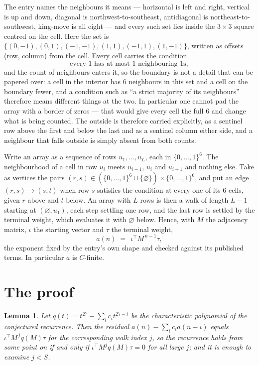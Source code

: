 \documentclass[11pt,a4paper]{article}
\theoremstyle{plain}
\newtheorem{lemma}[theorem]{Lemma}
\theoremstyle{definition}
\begin{document}
The entry names the neighbours it means --- horizontal is left and right, vertical is up and
down, diagonal is northwest-to-southeast, antidiagonal is northeast-to-southwest, king-move is
all eight --- and every such set lies inside the $3\times3$ square centred on the cell. Here
the set is $\{(0,-1), (0,1), (-1,-1), (1,1), (-1,1), (1,-1)\}$, written as offsets (row, column) from the cell. Every cell carries
the condition
\[
\text{every 1 has at most 1 neighbouring 1s},
\]
and the count of neighbours enters it, so the boundary is not a detail that can be papered
over: a cell in the interior has $6$ neighbours in this set and a cell on the boundary
fewer, and a condition such as ``a strict majority of its neighbours'' therefore means
different things at the two. In particular one cannot pad the array with a border of zeros ---
that would give every cell the full $6$ and change what is being counted. The outside is
therefore carried
explicitly, as a sentinel row above the first and below the last and as a sentinel column
either side, and a neighbour that falls outside is simply absent from both counts.

Write an array as a sequence of rows $u_1,\dots,u_L$, each in
$\{0,\dots,1\}^{6}$. The neighbourhood of a cell in row $u_i$ meets $u_{i-1}$,
$u_i$ and $u_{i+1}$ and nothing else. Take as vertices the pairs
$(r,s)\in(\{0,\dots,1\}^{6}\cup\{\varnothing\})\times\{0,\dots,1\}^{6}$,
and put an edge $(r,s)\to(s,t)$ when row $s$ satisfies the condition at every one of its
$6$ cells, given $r$ above and $t$ below. An array with $L$ rows is then a walk of length
$L-1$ starting at $(\varnothing,u_1)$, each step settling one row, and the last row is
settled by the terminal weight, which evaluates it with $\varnothing$ below. Hence,
with $M$ the adjacency matrix, $\iota$ the starting vector and $\tau$ the terminal weight,
\[
a(n)\;=\;\,\iota^{\!\top}M^{\,n-1}\tau ,
\]
the exponent fixed by the entry's own shape and checked against its published terms. In
particular $a$ is $C$-finite.

\section{The proof}

\begin{lemma}\label{lem:crit}
Let $q(t)=t^{27}-\sum_i c_it^{27-i}$ be the characteristic polynomial of the
conjectured recurrence. Then the residual $a(n)-\sum_ic_ia(n-i)$ equals
$\iota^{\!\top}M^{\,j}q(M)\tau$ for the corresponding walk index $j$, so the
recurrence holds from some point on if and only if $\iota^{\!\top}M^{j}q(M)\tau=0$ for all
large $j$; and it is enough to examine $j<S$.
\end{lemma}
\end{document}
